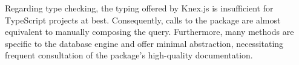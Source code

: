 Regarding type checking, the typing offered by Knex.js is insufficient for
TypeScript projects at best. Consequently, calls to the package are almost
equivalent to manually composing the query. Furthermore, many methods are
specific to the database engine and offer minimal abstraction, necessitating
frequent consultation of the package's high-quality documentation.
